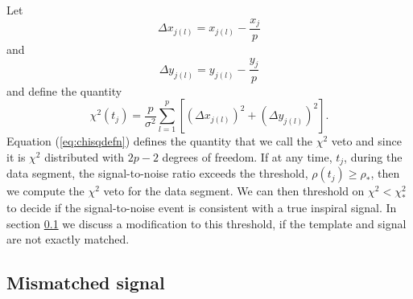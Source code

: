 Let
\begin{equation}
\Delta x_{j(l)} = x_{j(l)} - \frac{x_j}{p}
\end{equation}
and
\begin{equation}
\Delta y_{j(l)} = y_{j(l)} - \frac{y_j}{p}
\end{equation}
and define the quantity
\begin{equation}
\chi^2(t_j) = \frac{p}{\sigma^2} \sum_{l = 1}^p \left[ \left(\Delta x_{j(l)}\right)^2 + \left(\Delta y_{j(l)}\right)^2 \right].
\label{eq:chisqdefn}
\end{equation}
Equation (\ref{eq:chisqdefn}) defines the quantity that we call the $\chi^2$
veto and since it is $\chi^2$ distributed with $2p-2$ degrees of freedom.
If at any time, $t_j$, during the data segment, the signal-to-noise ratio
exceeds the threshold, $\rho(t_j) \ge \rho_\ast$, then we compute the $\chi^2$
veto for the data segment. We can then threshold on $\chi^2 < \chi^2_\ast$ to
decide if the signal-to-noise event is consistent with a true inspiral signal.
In section \ref{ss:mismatchedchisq} we discuss a modification to this
threshold, if the template and signal are not exactly matched.

\subsection{Mismatched signal}
\label{ss:mismatchedchisq}

